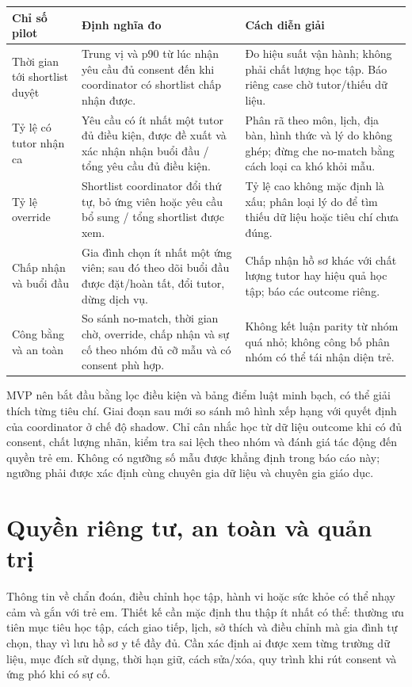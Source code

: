 \documentclass[11pt,a4paper]{article}
\begin{document}
\begin{tabularx}{\textwidth}{p{3.1cm}p{5.0cm}Y}
\toprule
\textbf{Chỉ số pilot} & \textbf{Định nghĩa đo} & \textbf{Cách diễn giải} \\
\midrule
Thời gian tới shortlist duyệt & Trung vị và p90 từ lúc nhận yêu cầu đủ consent
đến khi coordinator có shortlist chấp nhận được. & Đo hiệu suất vận hành; không
phải chất lượng học tập. Báo riêng case chờ tutor/thiếu dữ liệu. \\
Tỷ lệ có tutor nhận ca & Yêu cầu có ít nhất một tutor đủ điều kiện, được đề
xuất và xác nhận nhận buổi đầu / tổng yêu cầu đủ điều kiện. & Phân rã theo
môn, lịch, địa bàn, hình thức và lý do không ghép; đừng che no-match bằng cách
loại ca khó khỏi mẫu. \\
Tỷ lệ override & Shortlist coordinator đổi thứ tự, bỏ ứng viên hoặc yêu cầu
bổ sung / tổng shortlist được xem. & Tỷ lệ cao không mặc định là xấu; phân loại
lý do để tìm thiếu dữ liệu hoặc tiêu chí chưa đúng. \\
Chấp nhận và buổi đầu & Gia đình chọn ít nhất một ứng viên; sau đó theo dõi
buổi đầu được đặt/hoàn tất, đổi tutor, dừng dịch vụ. & Chấp nhận hồ sơ khác với
chất lượng tutor hay hiệu quả học tập; báo các outcome riêng. \\
Công bằng và an toàn & So sánh no-match, thời gian chờ, override, chấp nhận và
sự cố theo nhóm đủ cỡ mẫu và có consent phù hợp. & Không kết luận parity từ
nhóm quá nhỏ; không công bố phân nhóm có thể tái nhận diện trẻ. \\
\bottomrule
\end{tabularx}

MVP nên bắt đầu bằng lọc điều kiện và bảng điểm luật minh bạch, có thể giải
thích từng tiêu chí. Giai đoạn sau mới so sánh mô hình xếp hạng với quyết định
của coordinator ở chế độ shadow. Chỉ cân nhắc học từ dữ liệu outcome khi có
đủ consent, chất lượng nhãn, kiểm tra sai lệch theo nhóm và đánh giá tác động
đến quyền trẻ em. Không có ngưỡng số mẫu được khẳng định trong báo cáo này;
ngưỡng phải được xác định cùng chuyên gia dữ liệu và chuyên gia giáo dục.

\section{Quyền riêng tư, an toàn và quản trị}

Thông tin về chẩn đoán, điều chỉnh học tập, hành vi hoặc sức khỏe có thể nhạy
cảm và gắn với trẻ em. Thiết kế cần mặc định thu thập ít nhất có thể: thường
ưu tiên mục tiêu học tập, cách giao tiếp, lịch, sở thích và điều chỉnh mà gia
đình tự chọn, thay vì lưu hồ sơ y tế đầy đủ. Cần xác định ai được xem từng
trường dữ liệu, mục đích sử dụng, thời hạn giữ, cách sửa/xóa, quy trình khi rút
consent và ứng phó khi có sự cố.
\end{document}
